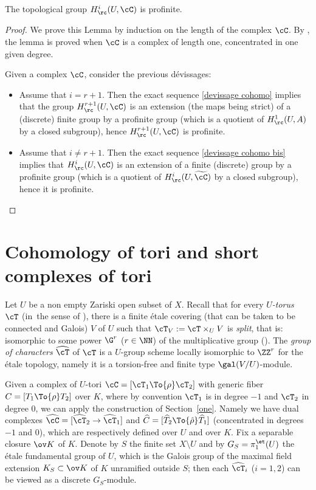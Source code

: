 \begin{lem} \label{lem topo profinite}
The topological group $H^i_\rc(U, \cC)$ is profinite.
\end{lem}

\begin{proof}
We prove this Lemma by induction on the length of the complex $\cC$.
By \cite[Prop.\,3.5]{DemH}, the lemma is proved when $\cC$ is a complex of length one, \ie concentrated in one given degree.

\pagebreak[2]
Given a complex $\cC$, consider the previous dévissages:
\begin{itemize}
\item Assume that $i = r+1$. Then the exact sequence \eqref{devissage cohomo} implies that the group $H^{r+1}_\rc(U, \cC)$ is an extension (the maps
being strict) of a (discrete) finite group by a profinite group (which is a quotient of $H^1_\rc(U, A)$ by a closed subgroup), hence $H^{r+1}_\rc(U, \cC)$ is profinite.
\item Assume that $i \neq r+1$. Then the exact sequence \eqref{devissage cohomo bis} implies that $H^i_\rc(U, \cC)$ is an extension of a finite (discrete) group by a profinite group (which is a quotient of $H^i_\rc(U, \widetilde{\cC})$ by a closed subgroup), hence it is profinite.\qedhere
\end{itemize}
\end{proof}

\section{Cohomology of tori and short complexes of tori} \label{onebis}

Let $U$ be a non empty
Zariski open subset of $X$. Recall that for every \emph{$U$-torus}~$\cT$ (in~the sense of \cite[IX, Déf.\,1.3]{sga3}),
there is a finite étale covering
(that can be taken to be connected and
Galois) $V$ of $U$ such that $\cT_V:=\cT \times_U V$
is \emph{split}, that is: isomorphic to some power $\G ^r$ ($r \in \NN$) of the
multiplicative group \hbox{(\cite[X, Th.\,5.16]{sga3})}. The \emph{group of characters}
$\widehat \cT$ of $\cT$ is a $U$-group scheme locally isomorphic to
$\ZZ^r$ for the étale topology, namely it is a torsion-free and finite
type $\gal(V/U)$-module.

Given a complex of $U$-tori $\cC=[\cT_1 \To{\rho} \cT_2]$
with generic fiber $C=[T_1 \To{\rho}T_2]$ over $K$,
where by convention $\cT_1$ is in degree $-1$ and $\cT_2$ in degree $0$, we
can apply the construction of Section~\ref{one}.
Namely we have dual complexes $\widehat \cC
=[\widehat \cT_2 \to \widehat \cT_1]$ and
$\widehat C=[\widehat T_2 \To{\hat \rho}
\widehat T_1]$ (concentrated in degrees $-1$ and $0$), which are
respectively defined over $U$ and over $K$. Fix a separable closure
$\ov K$ of $K$.
Denote by $S$ the finite set $X\setminus U$ and by $G_S=\pi_1^{\et}(U)$ the étale fundamental
group of $U$, which is the
Galois group of the maximal
field extension $K_S \subset \ov K$ of $K$ unramified outside $S$; then
each $\widehat \cT_i$ ($i=1,2$) can be viewed as a discrete $G_S$-module.

